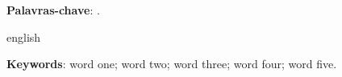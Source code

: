 \begin{resumoumacoluna}

    \lipsum[1-3] %

    \vspace{\onelineskip}
    \noindent
    \textbf{Palavras-chave}:
    \ValorDasPalavrasChave{}.
\end{resumoumacoluna}

\renewcommand{\resumoname}{Abstract}
\begin{resumoumacoluna}
    \begin{otherlanguage*}{english}

        \lipsum[4-6]

        \vspace{\onelineskip}
        \noindent
        \textbf{Keywords}:
        word one; word two; word three; word four; word five.
    \end{otherlanguage*}
\end{resumoumacoluna}




